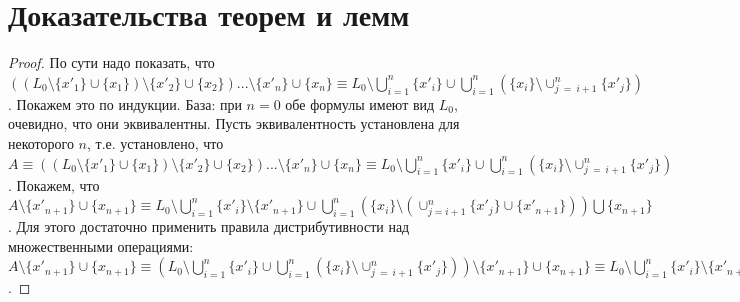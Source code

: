 \chapter{Доказательства теорем и лемм}\label{proofs}

\lemmatext{\ref{L_current}}{\LcurrentBody}

\begin{proof}
По сути надо показать, что $( (L_0 \setminus \{x'_1\} \cup \{x_1\})
\setminus \{x'_2\} \cup \{x_2\}) ... \setminus \{x'_n\} \cup \{x_n\}
\equiv L_0 \setminus \bigcup_{i=1}^n \{x'_i\} \cup \bigcup_{i=1}^n (
\{x_i\} \setminus \cup_{j~=~i+1}^n \{x'_j\})$. Покажем это по
индукции. База: при $n = 0$ обе формулы имеют вид $L_0$, очевидно,
что они эквивалентны. Пусть эквивалентность установлена для
некоторого $n$, т.е. установлено, что $A \equiv ( (L_0 \setminus
\{x'_1\} \cup \{x_1\}) \setminus \{x'_2\} \cup \{x_2\}) ...
\setminus \{x'_n\} \cup \{x_n\} \equiv L_0 \setminus \bigcup_{i=1}^n
\{x'_i\} \cup \bigcup_{i=1}^n ( \{x_i\} \setminus \cup_{j~=~i+1}^n
\{x'_j\})$. Покажем, что $A \setminus \{x'_{n+1}\} \cup \{x_{n+1}\}
\equiv L_0 \setminus \bigcup_{i=1}^n \{x'_i\} \setminus \{x'_{n+1}\}
\cup \bigcup_{i=1}^n ( \{x_i\} \setminus (\cup_{j = i+1}^n \{x'_j\}
\cup \{x'_{n+1}\})) \bigcup \{x_{n+1}\}$. Для этого достаточно
применить правила дистрибутивности над множественными операциями: $A
\setminus \{x'_{n+1}\} \cup \{x_{n+1}\} \equiv (L_0 \setminus
\bigcup_{i=1}^n \{x'_i\} \cup \bigcup_{i=1}^n ( \{x_i\} \setminus
\cup_{j~=~i+1}^n \{x'_j\})) \setminus \{x'_{n+1}\} \cup \{x_{n+1}\}
\equiv L_0 \setminus \bigcup_{i=1}^n \{x'_i\}\setminus \{x'_{n+1}\}
\cup \bigcup_{i=1}^n ( \{x_i\} \setminus \cup_{j~=~i+1}^n \{x'_j\}
\setminus \{x'_{n+1}\} ) \cup \{x_{n+1}\}$.
\end{proof}



